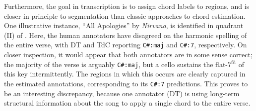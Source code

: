 \documentclass{article}
\begin{document}
Furthermore, the goal in transcription is to assign chord labels to regions, and is closer in principle to segmentation than classic approaches to chord estimation.
One illustrative instance, ``All Apologies'' by \emph{Nirvana}, is identified in quadrant (II) of .
Here, the human annotators have disagreed on the harmonic spelling of the entire verse, with DT and TdC reporting \texttt{C\#:maj} and \texttt{C\#:7}, respectively.
On closer inspection, it would appear that both annotators are in some sense correct;
the majority of the verse is arguably \texttt{C\#:maj}, but a cello sustains the flat-$7^{th}$ of this key intermittently.
The regions in which this occurs are clearly captured in the estimated annotations, corresponding to its \texttt{C\#:7} predictions.
This proves to be an interesting discrepancy, because one annotator (DT) is using long-term structural information about the song to apply a single chord to the entire verse.
\end{document}
